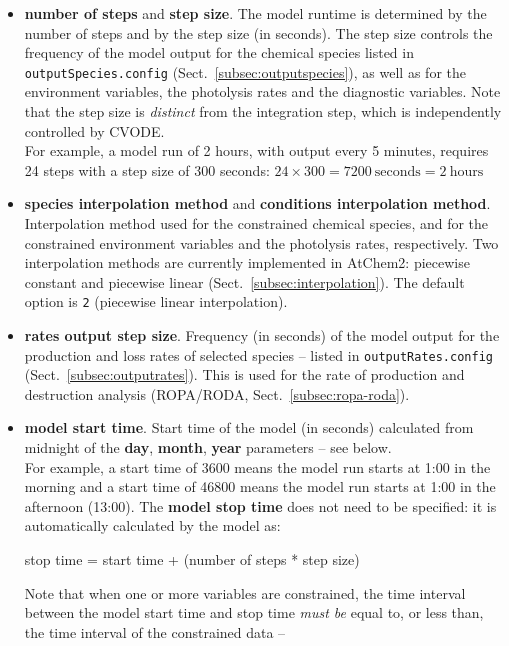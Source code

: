\begin{itemize}
\item \textbf{number of steps} and \textbf{step size}. The model
  runtime is determined by the number of steps and by the step size
  (in seconds). The step size controls the frequency of the model
  output for the chemical species listed in \texttt{outputSpecies.config}
  (Sect.~\ref{subsec:outputspecies}), as well as for the environment
  variables, the photolysis rates and the diagnostic variables. Note
  that the step size is \emph{distinct} from the integration step,
  which is independently controlled by CVODE.\\
  For example, a model run of 2 hours, with output every 5 minutes,
  requires 24 steps with a step size of 300 seconds:
  $24 \times 300 = 7200~\mathrm{seconds} = 2~\mathrm{hours}$
\item \textbf{species interpolation method} and
  \textbf{conditions interpolation method}. Interpolation method used
  for the constrained chemical species, and for the constrained environment
  variables and the photolysis rates, respectively. Two interpolation
  methods are currently implemented in AtChem2: piecewise constant and
  piecewise linear (Sect.~\ref{subsec:interpolation}). The default
  option is \texttt{2} (piecewise linear interpolation).
\item \textbf{rates output step size}. Frequency (in seconds) of the
  model output for the production and loss rates of selected species --
  listed in \texttt{outputRates.config} (Sect.~\ref{subsec:outputrates}).
  This is used for the rate of production and destruction analysis
  (ROPA/RODA, Sect.~\ref{subsec:ropa-roda}).
\item \textbf{model start time}. Start time of the model (in seconds)
  calculated from midnight of the \textbf{day}, \textbf{month},
  \textbf{year} parameters -- see below.\\
  For example, a start time of 3600 means the model run starts at 1:00
  in the morning and a start time of 46800 means the model run starts
  at 1:00 in the afternoon (13:00). The \textbf{model stop time} does
  not need to be specified: it is automatically calculated by the
  model as:
  \begin{center}
    stop time = start time + (number of steps * step size)
  \end{center}
  Note that when one or more variables are constrained, the time
  interval between the model start time and stop time \emph{must be}
  equal to, or less than, the time interval of the constrained data --

\end{itemize}

